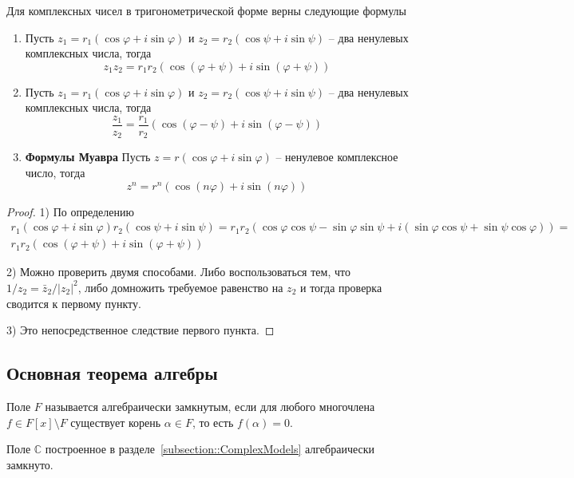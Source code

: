 \begin{claim}
\label{claim::ComplexMultProp}
Для комплексных чисел в тригонометрической форме верны следующие формулы
\begin{enumerate}
\item Пусть $z_1 = r_1(\cos \varphi + i \sin \varphi)$ и $z_2=r_2(\cos \psi + i \sin \psi)$ -- два ненулевых комплексных числа, тогда
\[
z_1 z_2 = r_1 r_2 (\cos(\varphi + \psi) + i\sin(\varphi + \psi))
\]

\item Пусть $z_1 = r_1(\cos \varphi + i \sin \varphi)$ и $z_2=r_2(\cos \psi + i \sin \psi)$ -- два ненулевых комплексных числа, тогда
\[
\frac{z_1}{z_2} = \frac{r_1}{r_2}(\cos(\varphi - \psi) + i\sin(\varphi - \psi))
\]

\item {\bf Формулы Муавра}
Пусть $z = r(\cos \varphi + i \sin \varphi)$ -- ненулевое комплексное число, тогда
\[
z^n = r^n (\cos(n \varphi) + i \sin(n \varphi))
\]
\end{enumerate}
\end{claim}
\begin{proof}
1) По определению
\begin{gather*}
r_1(\cos \varphi + i \sin \varphi) r_2 (\cos \psi + i \sin \psi) = r_1 r_2 (\cos \varphi \cos \psi - \sin \varphi \sin \psi + i (\sin\varphi \cos \psi + \sin \psi \cos \varphi)) =\\ r_1r_2(\cos(\varphi + \psi) + i\sin (\varphi + \psi))
\end{gather*}

2) Можно проверить двумя способами.
Либо воспользоваться тем, что $1/z_2 = \bar z_2 /|z_2|^2$, либо домножить требуемое равенство на $z_2$ и тогда проверка сводится к первому пункту.

3) Это непосредственное следствие первого пункта.
\end{proof}

\subsection{Основная теорема алгебры}
\label{section::MainAlgThm}

\begin{definition}
\label{def::AlgClosedField}
Поле $F$ называется алгебраически замкнутым, если для любого многочлена $f\in F[x]\setminus F$ существует корень $\alpha\in F$, то есть $f(\alpha) = 0$.
\end{definition}

\begin{claim}
\label{claim::CAlgClosed}
Поле $\mathbb C$ построенное в разделе~\ref{subsection::ComplexModels} алгебраически замкнуто.
\end{claim}

